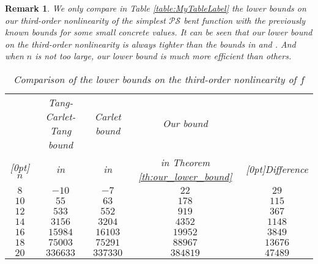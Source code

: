 \documentclass{article}
\newcommand{\0}{\textbf{0}}
\newcommand{\1}{\textbf{1}}
\theoremstyle{plain}
\newtheorem{remark}{Remark}
\begin{document}
    \begin{remark}
        \newcommand{\rb}[1]{\raisebox{1.5ex}[0pt]{#1}}
        We only compare in Table \ref{table:MyTableLabel} the lower bounds on our third-order nonlinearity of the simplest $ \mathcal{PS} $ bent function with the previously known bounds for some small concrete values. 
        It can be seen that our lower bound on the third-order nonlinearity is always tighter than the bounds in \cite{TangCT2013NL_2bent} and \cite{Carlet2011NL_Profile_Dillon}. And when $ n $ is not too large, our lower bound is much more efficient than others. 
        \begin{table}                                           
            \centering                                              
            \caption{Comparison of the lower bounds on the third-order nonlinearity of $ f $}                       
            \begin{threeparttable}
                \begin{tabular}{|c|c|c|c|c|}                                      
                    \hline   
                            & Tang-Carlet-Tang bound      & Carlet bound                            & Our bound& \\  
                    \rb{$n$}& in \cite{TangCT2013NL_2bent}& in \cite{Carlet2011NL_Profile_Dillon} & in Theorem \ref{th:our_lower_bound}     &\rb{Difference\tnote{1}}   \\
                    \hline         
                    $8  $ &  $ -10         $       & $ -7       $     & $ 22       $     & $  29      $ \\  \hline     
                    $10 $ &  $ 55          $       & $ 63       $     & $ 178      $     & $  115     $ \\  \hline     
                    $12 $ &  $ 533         $       & $ 552      $     & $ 919      $     & $  367     $ \\  \hline     
                    $14 $ &  $ 3156        $       & $ 3204     $     & $ 4352     $     & $  1148    $ \\  \hline     
                    $16 $ &  $ 15984       $       & $ 16103    $     & $ 19952    $     & $  3849    $ \\  \hline     
                    $18 $ &  $ 75003       $       & $ 75291    $     & $ 88967    $     & $  13676   $ \\  \hline     
                    $20 $ &  $ 336633      $       & $ 337330   $     & $ 384819   $     & $  47489   $ \\  \hline     

\end{tabular}
\end{threeparttable}
\end{table}
\end{remark}
\end{document}
